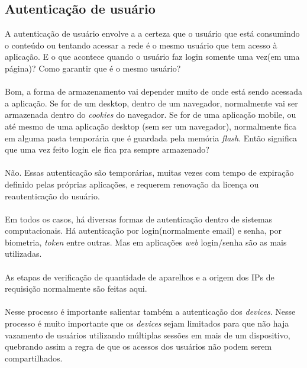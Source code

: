 \subsection{Autentica\c{c}\~ao de usu\'ario}
\label{subsection:autenticacao_usuario}
A autentica\c{c}\~ao de usu\'ario envolve a a certeza que o usu\'ario que est\'a consumindo o conte\'udo ou tentando acessar a rede \'e o mesmo usu\'ario que tem acesso \`a aplica\c{c}\~ao. E o que acontece quando o usu\'ario faz login somente uma vez(em uma p\'agina)? Como garantir que \'e o mesmo usu\'ario?
\paragraph{}
Bom, a forma de armazenamento vai depender muito de onde est\'a sendo acessada a aplica\c{c}\~ao. Se for de um desktop, dentro de um navegador, normalmente vai ser armazenada dentro do \textit{cookies} do navegador. Se for de uma aplica\c{c}\~ao mobile, ou at\'e mesmo de uma aplica\c{c}\~ao desktop (sem ser um navegador), normalmente fica em alguma pasta tempor\'aria que \'e guardada pela mem\'oria \textit{flash}. Ent\~ao significa que uma vez feito login ele fica pra sempre armazenado?
\paragraph{}
N\~ao. Essas autentica\c{c}\~ao s\~ao tempor\'arias, muitas vezes com tempo de expira\c{c}\~ao definido pelas pr\'oprias aplica\c{c}\~oes, e requerem renova\c{c}\~ao da licen\c{c}a ou reautentica\c{c}\~ao do usu\'ario. 
\paragraph{}
Em todos os casos, h\'a diversas formas de autentica\c{c}\~ao dentro de sistemas computacionais. H\'a autentica\c{c}\~ao por login(normalmente email) e senha, por biometria, \textit{token} entre outras. Mas em aplica\c{c}\~oes \textit{web} login/senha s\~ao as mais utilizadas.
\paragraph{}
As etapas de verifica\c{c}\~ao de quantidade de aparelhos e a origem dos IPs de requisi\c{c}\~ao normalmente s\~ao feitas aqui.
\paragraph{}
Nesse processo \'e importante salientar tamb\'em a autentica\c{c}\~ao dos \textit{devices}. Nesse processo \'e muito importante que os \textit{devices} sejam limitados para que n\~ao haja vazamento de usu\'arios utilizando m\'ultiplas sess\~oes em mais de um dispositivo, quebrando assim a regra de que os acessos dos usu\'arios n\~ao podem serem compartilhados.
